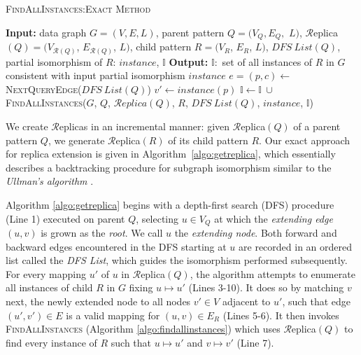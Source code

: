 \begin{algorithm}[tb!]
 \caption{\textsc{FindAllInstances:Exact Method}}
 \label{algo:findallinstances}
{\scriptsize
 \dontprintsemicolon
 \nonl \textbf{Input:} data graph $G=(V,E,L)$, parent
 pattern $Q=(V_Q,E_Q,$ $L)$, $\mathcal{R}$eplica$(Q)=(V_{\mathcal{R}(Q)}$,
 $E_{\mathcal{R}(Q)}$, $L)$, child pattern $R=(V_R$, $E_R$, $L)$,
    $DFS\ List(Q)$, partial isomorphism of $R$: $instance$, $\mathbb{I}$\;
\nonl \textbf{Output:} $\mathbb{I}: $ set of all instances of $R$ in $G$ consistent with input partial isomorphism $instance$\;
	{
	}
	\Else
	{
		$e=(p,c)\leftarrow$ \textsc{NextQueryEdge($DFS\ List(Q)$)}\;
		$v' \leftarrow instance(p)$\;
		{
			{
				$\mathbb{I} \leftarrow \mathbb{I}\ \cup$ \textsc{FindAllInstances({$G$}, $Q$, $\mathcal{R}eplica(Q)$, $R$, $DFS\ List(Q)$, $instance$, $\mathbb{I}$)}\;
			}
			\Else{\Return $\emptyset$}
		}
		\;
	}}
\end{algorithm}
%
%
We create $\mathcal{R}$eplicas in an incremental manner: given $\mathcal{R}$eplica$(Q)$ of a parent
pattern $Q$, we generate $\mathcal{R}$eplica$(R)$ of its child pattern $R$. Our exact approach for
replica extension is given in Algorithm~\ref{algo:getreplica}, which essentially describes a backtracking
procedure for subgraph isomorphism similar to the {\em Ullman's algorithm} \cite{U76}.


Algorithm \ref{algo:getreplica} begins with a depth-first search ({\sf DFS}) procedure (Line 1)
executed on parent $Q$, selecting $u\in V_{Q}$ at which the
\emph{extending edge} $(u,v)$ is grown as the \emph{root}. We call $u$ the
\textit{extending node}. Both forward and backward edges encountered in the {\sf DFS}
starting at $u$ are recorded in an ordered list called the \emph{DFS List},
which guides the isomorphism performed subsequently. For every mapping $u'$ of
$u$ in $\mathcal{R}$eplica$(Q)$, the algorithm attempts to enumerate all
instances of child $R$ in $G$ fixing $u\mapsto u'$ (Lines 3-10). It does so by matching $v$
next, the newly extended node to all nodes $v'\in V$ adjacent to $u'$,
such that edge $(u',v')\in E$ is a valid mapping for $(u,v)\in E_{R}$ (Lines 5-6). It
then invokes \textsc{FindAllInstances} (Algorithm \ref{algo:findallinstances})
which uses $\mathcal{R}$eplica$(Q)$ to find every instance of $R$ such that
$u\mapsto u'$ and $v\mapsto v'$ (Line 7).

